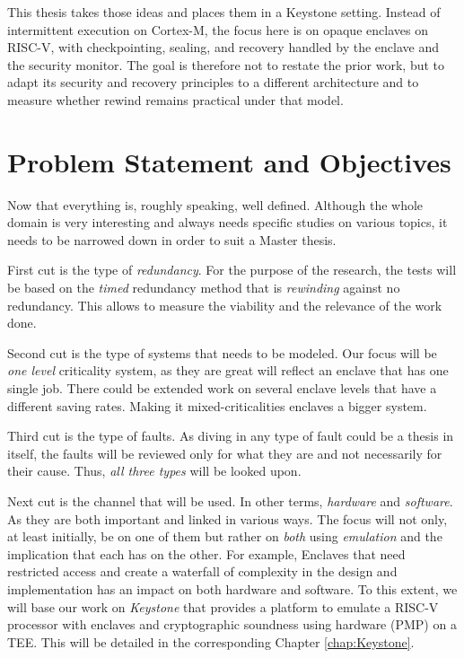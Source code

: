 \documentclass[11pt,a4paper]{report}
\begin{document}
This thesis takes those ideas and places them in a Keystone setting.
Instead of intermittent execution on Cortex-M, the focus here is on opaque enclaves on RISC-V, with checkpointing, sealing, and recovery handled by the enclave and the security monitor.
The goal is therefore not to restate the prior work, but to adapt its security and recovery principles to a different architecture and to measure whether rewind remains practical under that model.






\chapter{Problem Statement and Objectives}
Now that everything is, roughly speaking, well defined. 
Although the whole domain is very interesting and always needs specific studies on various topics, it needs to be narrowed down in order to suit a Master thesis.

First cut is the type of \textit{redundancy}. 
For the purpose of the research, the tests will be based on the \textit{timed} redundancy method that is \textit{rewinding} against no redundancy. 
This allows to measure the viability and the relevance of the work done. 

Second cut is the type of systems that needs to be modeled. 
Our focus will be \textit{one level} criticality system, as they are great will reflect an enclave that has one single job.
There could be extended work on several enclave levels that have a different saving rates. 
Making it mixed-criticalities enclaves a bigger system.

Third cut is the type of faults. 
As diving in any type of fault could be a thesis in itself, the faults will be reviewed only for what they are and not necessarily for their cause. 
Thus, \textit{all three types} will be looked upon.

Next cut is the channel that will be used. 
In other terms, \textit{hardware} and \textit{software}. 
As they are both important and linked in various ways. 
The focus will not only, at least initially, be on one of them but rather on \textit{both} using \textit{emulation} and the implication that each has on the other. 
For example, Enclaves that need restricted access and create a waterfall of complexity in the design and implementation has an impact on both hardware and software. 
To this extent, we will base our work on \textit{Keystone} that provides a platform to emulate a RISC-V processor with enclaves and cryptographic soundness using hardware (PMP) on a TEE\cite{keystone-repo, keystone-web, keystone-docs}.
This will be detailed in the corresponding Chapter \ref{chap:Keystone}.
\end{document}
